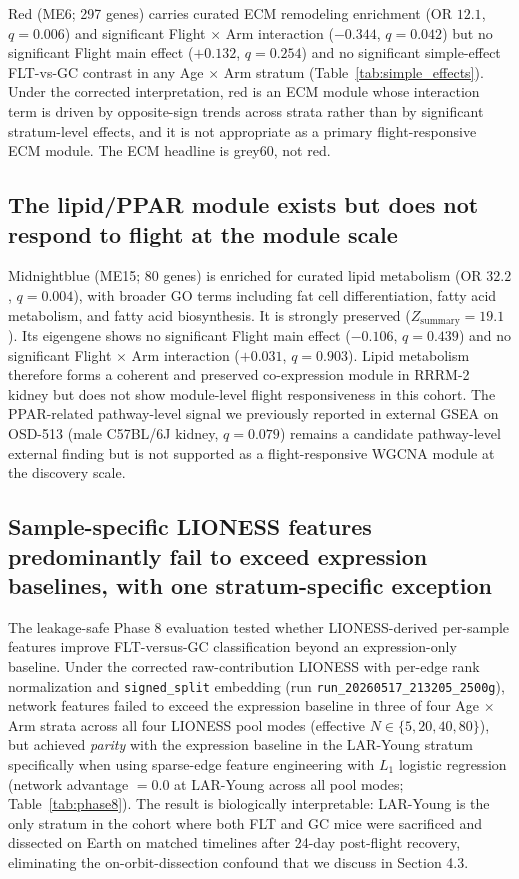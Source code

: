 \documentclass[11pt]{article}
\newcommand{\code}[1]{\texttt{#1}}
\begin{document}
Red (ME6; 297 genes) carries curated ECM remodeling enrichment (OR $12.1$, $q = 0.006$) and significant Flight $\times$ Arm interaction ($-0.344$, $q = 0.042$) but no significant Flight main effect ($+0.132$, $q = 0.254$) and no significant simple-effect FLT-vs-GC contrast in any Age $\times$ Arm stratum (Table~\ref{tab:simple_effects}). Under the corrected interpretation, red is an ECM module whose interaction term is driven by opposite-sign trends across strata rather than by significant stratum-level effects, and it is not appropriate as a primary flight-responsive ECM module. The ECM headline is grey60, not red.

\subsection{The lipid/PPAR module exists but does not respond to flight at the module scale}

Midnightblue (ME15; 80 genes) is enriched for curated lipid metabolism (OR $32.2$, $q = 0.004$), with broader GO terms including fat cell differentiation, fatty acid metabolism, and fatty acid biosynthesis. It is strongly preserved ($Z_{\text{summary}} = 19.1$). Its eigengene shows no significant Flight main effect ($-0.106$, $q = 0.439$) and no significant Flight $\times$ Arm interaction ($+0.031$, $q = 0.903$). Lipid metabolism therefore forms a coherent and preserved co-expression module in RRRM-2 kidney but does not show module-level flight responsiveness in this cohort. The PPAR-related pathway-level signal we previously reported in external GSEA on OSD-513 (male C57BL/6J kidney, $q = 0.079$) remains a candidate pathway-level external finding but is not supported as a flight-responsive WGCNA module at the discovery scale.

\subsection{Sample-specific LIONESS features predominantly fail to exceed expression baselines, with one stratum-specific exception}

The leakage-safe Phase 8 evaluation tested whether LIONESS-derived per-sample features improve FLT-versus-GC classification beyond an expression-only baseline. Under the corrected raw-contribution LIONESS with per-edge rank normalization and \code{signed\_split} embedding (run \code{run\_20260517\_213205\_2500g}), network features failed to exceed the expression baseline in three of four Age $\times$ Arm strata across all four LIONESS pool modes (effective $N \in \{5, 20, 40, 80\}$), but achieved \emph{parity} with the expression baseline in the LAR-Young stratum specifically when using sparse-edge feature engineering with $L_1$ logistic regression (network advantage $= 0.0$ at LAR-Young across all pool modes; Table~\ref{tab:phase8}). The result is biologically interpretable: LAR-Young is the only stratum in the cohort where both FLT and GC mice were sacrificed and dissected on Earth on matched timelines after 24-day post-flight recovery, eliminating the on-orbit-dissection confound that we discuss in Section 4.3.
\end{document}
